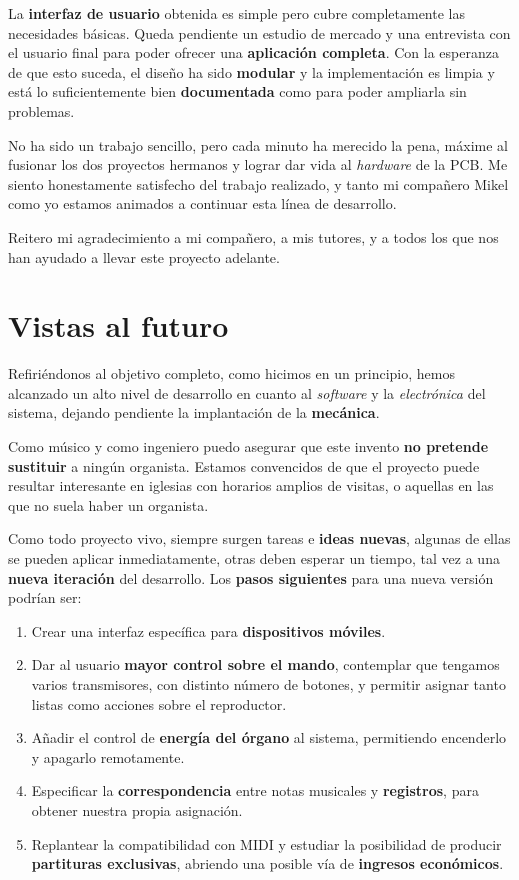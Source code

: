 La \textbf{interfaz de usuario} obtenida es simple pero cubre completamente las necesidades básicas. Queda pendiente un estudio de mercado y una entrevista con el usuario final para poder ofrecer una \textbf{aplicación completa}. Con la esperanza de que esto suceda, el diseño ha sido \textbf{modular} y la implementación es limpia y está lo suficientemente bien \textbf{documentada} como para poder ampliarla sin problemas.

No ha sido un trabajo sencillo, pero cada minuto ha merecido la pena, máxime al fusionar los dos proyectos hermanos y lograr dar vida al \textit{hardware} de la \acrshort{PCB}. Me siento honestamente satisfecho del trabajo realizado, y tanto mi compañero Mikel como yo estamos animados a continuar esta línea de desarrollo.

Reitero mi agradecimiento a mi compañero, a mis tutores, y a todos los que nos han ayudado a llevar este proyecto adelante.

\newpage

\section{Vistas al futuro}

Refiriéndonos al objetivo completo, como hicimos en un principio, hemos alcanzado un alto nivel de desarrollo en cuanto al \textit{software} y la \textit{electrónica} del sistema, dejando pendiente la implantación de la \textbf{mecánica}.

Como músico y como ingeniero puedo asegurar que este invento \textbf{no pretende sustituir} a ningún organista. Estamos convencidos de que el proyecto puede resultar interesante en iglesias con horarios amplios de visitas, o aquellas en las que no suela haber un organista.

Como todo proyecto vivo, siempre surgen tareas e \textbf{ideas nuevas}, algunas de ellas se pueden aplicar inmediatamente, otras deben esperar un tiempo, tal vez a una \textbf{nueva iteración} del desarrollo. Los \textbf{pasos siguientes} para una nueva versión podrían ser:

\begin{enumerate}
	\item Crear una interfaz específica para \textbf{dispositivos móviles}.
	\item Dar al usuario \textbf{mayor control sobre el mando}, contemplar que tengamos varios transmisores, con distinto número de botones, y permitir asignar tanto listas como acciones sobre el reproductor.
	\item Añadir el control de \textbf{energía del órgano} al sistema, permitiendo encenderlo y apagarlo remotamente.
	\item Especificar la \textbf{correspondencia} entre notas musicales y \textbf{registros}, para obtener nuestra propia asignación.
	\item Replantear la compatibilidad con \acrshort{MIDI} y estudiar la posibilidad de producir \textbf{partituras exclusivas}, abriendo una posible vía de \textbf{ingresos económicos}.
\end{enumerate}

